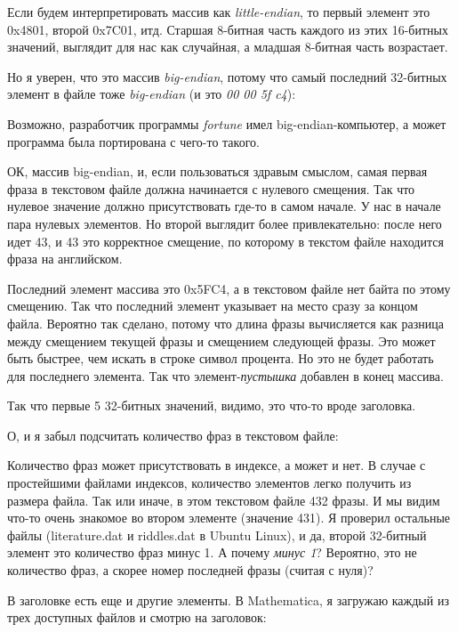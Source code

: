 

Если будем интерпретировать массив как \emph{little-endian}, то первый элемент это 0x4801, второй 0x7C01, итд.
Старшая 8-битная часть каждого из этих 16-битных значений, выглядит для нас как случайная, а младшая 8-битная часть
возрастает.

Но я уверен, что это массив \emph{big-endian}, потому что самый последний 32-битных элемент в файле
тоже \emph{big-endian} (и это \emph{00 00 5f c4}):



Возможно, разработчик программы \emph{fortune} имел big-endian-компьютер, а может программа была портирована с чего-то такого.

ОК, массив big-endian, и, если пользоваться здравым смыслом, самая первая фраза в текстовом файле должна начинается с нулевого
смещения.
Так что нулевое значение должно присутствовать где-то в самом начале.
У нас в начале пара нулевых элементов. Но второй выглядит более привлекательно: после него идет 43, и 43 это корректное
смещение, по которому в текстом файле находится фраза на английском.

Последний элемент массива это 0x5FC4, а в текстовом файле нет байта по этому смещению.
Так что последний элемент указывает на место сразу за концом файла.
Вероятно так сделано, потому что длина фразы вычисляется как разница между смещением текущей фразы
и смещением следующей фразы.
Это может быть быстрее, чем искать в строке символ процента. 
Но это не будет работать для последнего элемента.
Так что элемент-\emph{пустышка} добавлен в конец массива.

Так что первые 5 32-битных значений, видимо, это что-то вроде заголовка.

О, и я забыл подсчитать количество фраз в текстовом файле:



Количество фраз может присутствовать в индексе, а может и нет.
В случае с простейшими файлами индексов, количество элементов легко получить из размера файла.
Так или иначе, в этом текстовом файле 432 фразы.
И мы видим что-то очень знакомое во втором элементе (значение 431).
Я проверил остальные файлы (literature.dat и riddles.dat в Ubuntu Linux), и да, второй 32-битный элемент это
количество фраз минус 1.
А почему \emph{минус 1}? Вероятно, это не количество фраз, а скорее номер последней фразы (считая с нуля)?

В заголовке есть еще и другие элементы.
В Mathematica, я загружаю каждый из трех доступных файлов и смотрю на заголовок:

